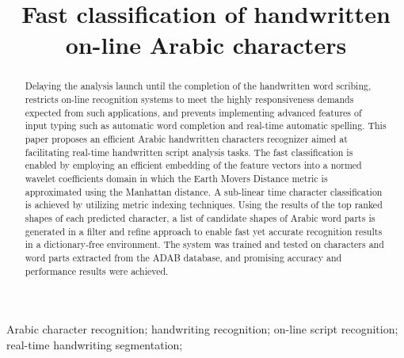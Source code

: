 \documentclass[10pt, conference, compsocconf]{IEEEtran}
\begin{document}
\title{Fast classification of handwritten on-line Arabic characters}

\author{
\and
{}
}


\maketitle

\begin{abstract}
Delaying the analysis launch until the completion of the handwritten word scribing, restricts on-line recognition systems to meet the highly responsiveness demands expected from such applications, and prevents implementing advanced features of input typing such as automatic word completion and real-time automatic spelling.
This paper proposes an efficient Arabic handwritten characters recognizer aimed at facilitating real-time handwritten script analysis tasks.
The fast classification is enabled by employing an efficient embedding of the feature vectors into a normed wavelet coefficients domain in which the Earth Movers Distance metric is approximated using the Manhattan distance.
A sub-linear time character classification is achieved by utilizing metric indexing techniques.
Using the results of the top ranked shapes of each predicted character, a list of candidate shapes of Arabic word parts is generated in a filter and refine approach to enable fast yet accurate recognition results in a dictionary-free environment.
The system was trained and tested on characters and word parts extracted from the ADAB database, and promising accuracy and performance results were achieved.\\
\end{abstract}

\begin{IEEEkeywords}
Arabic character recognition; handwriting recognition; on-line script recognition; real-time handwriting segmentation;
\end{IEEEkeywords}
\end{document}

